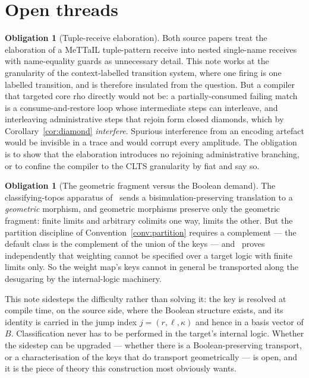 \documentclass[11pt]{article}
\theoremstyle{definition}
\newtheorem{obligation}[definition]{Obligation}
\theoremstyle{plain}
\begin{document}
\section{Open threads}\label{sec:open}

\begin{obligation}[Tuple-receive elaboration]\label{ob:tuple}
Both source papers treat the elaboration of a MeTTaIL tuple-pattern receive into nested
single-name receives with name-equality guards as unnecessary detail. This note works at the
granularity of the context-labelled transition system, where one firing is one labelled
transition, and is therefore insulated from the question. But a compiler that targeted core rho
directly would not be: a partially-consumed failing match is a consume-and-restore loop whose
intermediate steps can interleave, and interleaving administrative steps that rejoin form closed
diamonds, which by Corollary~\ref{cor:diamond} \emph{interfere}. Spurious interference from an
encoding artefact would be invisible in a trace and would corrupt every amplitude. The obligation
is to show that the elaboration introduces no rejoining administrative branching, or to confine
the compiler to the CLTS granularity by fiat and say so.
\end{obligation}

\begin{obligation}[The geometric fragment versus the Boolean demand]\label{ob:geometric}
The classifying-topos apparatus of~\cite[\S4.4]{knotted} sends a bisimulation-preserving
translation to a \emph{geometric} morphism, and geometric morphisms preserve only the geometric
fragment: finite limits and arbitrary colimits one way, limits the other. But the partition
discipline of Convention~\ref{conv:partition} requires a complement --- the default class is the
complement of the union of the keys --- and~\cite{weighted} proves independently that weighting
cannot be specified over a target logic with finite limits only. So the weight map's keys cannot
in general be transported along the desugaring by the internal-logic machinery.

This note sidesteps the difficulty rather than solving it: the key is resolved at compile time,
on the source side, where the Boolean structure exists, and its identity is carried in the jump
index $j = (r,\ell,\kappa)$ and hence in a basis vector of $B$. Classification never has to be
performed in the target's internal logic. Whether the sidestep can be upgraded --- whether there
is a Boolean-preserving transport, or a characterisation of the keys that do transport
geometrically --- is open, and it is the piece of theory this construction most obviously wants.
\end{obligation}
\end{document}
